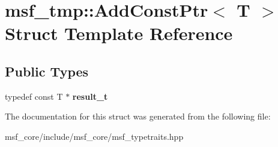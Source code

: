 \hypertarget{structmsf__tmp_1_1AddConstPtr}{\section{msf\-\_\-tmp\-:\-:Add\-Const\-Ptr$<$ T $>$ Struct Template Reference}
\label{structmsf__tmp_1_1AddConstPtr}
}
\subsection*{Public Types}
\begin{DoxyCompactItemize}
\item 
\hypertarget{structmsf__tmp_1_1AddConstPtr_ac8ecd5117ac2c0151b69730c134d41bb}{typedef const T $\ast$ {\bfseries result\-\_\-t}}\label{structmsf__tmp_1_1AddConstPtr_ac8ecd5117ac2c0151b69730c134d41bb}

\end{DoxyCompactItemize}


The documentation for this struct was generated from the following file\-:\begin{DoxyCompactItemize}
\item 
msf\-\_\-core/include/msf\-\_\-core/msf\-\_\-typetraits.\-hpp\end{DoxyCompactItemize}
